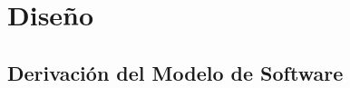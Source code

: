 \documentclass[12pt]{article}
\makeatletter
\renewcommand\paragraph{\@startsection{paragraph}{4}{\z@}%
	{-2.5ex\@plus -1ex \@minus -.25ex}%
	{1.25ex \@plus .25ex}%
	{\normalfont\normalsize\bfseries}}
\makeatother
\begin{document}
\newpage



\newpage


\newpage


\newpage



\newpage
\section{Diseño}
\subsection{Derivación del Modelo de Software}
\end{document}
